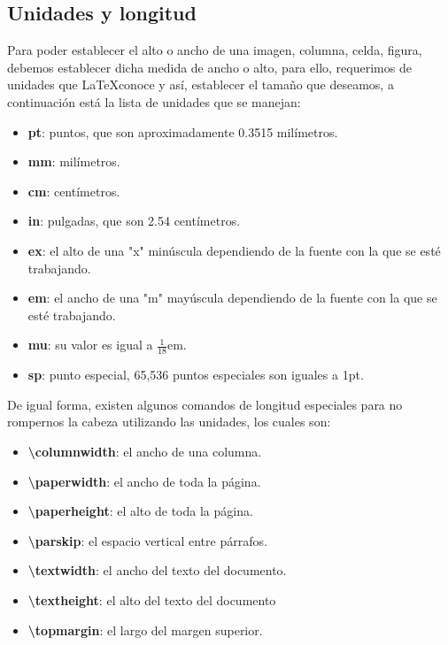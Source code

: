 \subsection{Unidades y longitud}

Para poder establecer el alto o ancho de una imagen, columna, celda, figura, debemos establecer dicha medida de ancho o alto, para ello, requerimos de unidades que \LaTeX conoce y así, establecer el tamaño que deseamos, a continuación está la lista de unidades que se manejan:
\begin{itemize}
    \item \textbf{pt}: puntos, que son aproximadamente 0.3515 milímetros.
    \item \textbf{mm}: milímetros.
    \item \textbf{cm}: centímetros.
    \item \textbf{in}: pulgadas, que son 2.54 centímetros.
    \item \textbf{ex}: el alto de una "x" minúscula dependiendo de la fuente con la que se esté trabajando.
    \item \textbf{em}: el ancho de una "m" mayúscula dependiendo de la fuente con la que se esté trabajando.
    \item \textbf{mu}: su valor es igual a $\frac{1}{18}$em.
    \item \textbf{sp}: punto especial, 65,536 puntos especiales son iguales a 1pt.
\end{itemize}

De igual forma, existen algunos comandos de longitud especiales para no rompernos la cabeza utilizando las unidades, los cuales son:
\begin{itemize}
    \item \textbf{\textbackslash{columnwidth}}: el ancho de una columna.
    \item \textbf{\textbackslash{paperwidth}}: el ancho de toda la página.
    \item \textbf{\textbackslash{paperheight}}: el alto de toda la página.
    \item \textbf{\textbackslash{parskip}}: el espacio vertical entre párrafos.
    \item \textbf{\textbackslash{textwidth}}: el ancho del texto del documento.
    \item \textbf{\textbackslash{textheight}}: el alto del texto del documento
    \item \textbf{\textbackslash{topmargin}}: el largo del margen superior.
\end{itemize}

